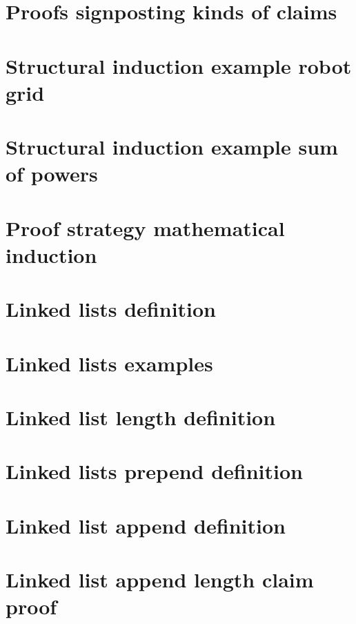 \section*{Proofs signposting kinds of claims}

\vfill
\section*{Structural induction example robot grid}

\vfill
\section*{Structural induction example sum of powers}

\vfill
\section*{Proof strategy mathematical induction}

\vfill
\section*{Linked lists definition}

\vfill
\section*{Linked lists examples}

\vfill
\section*{Linked list length definition}

\vfill
\section*{Linked lists prepend definition}

\vfill
\section*{Linked list append definition}

\vfill
\section*{Linked list append length claim proof}

\vfill
